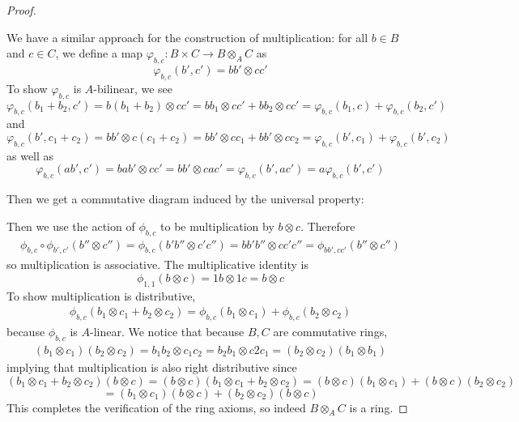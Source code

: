 \documentclass{article}
\begin{document}
\begin{proof}
\begin{enumerate}[(a)]
    We have a similar approach for the construction of multiplication: for all $b\in B$ and $c\in C$, we define a map $\varphi_{b,c}:B\times C\to B\otimes_A C$ as
    \[
    \varphi_{b,c}(b',c')=bb'\otimes cc'
    \]
    To show $\varphi_{b,c}$ is $A$-bilinear, we see
    \[
    \varphi_{b,c}(b_1+b_2,c')=b(b_1+b_2)\otimes cc'=bb_1\otimes cc'+bb_2\otimes cc'=\varphi_{b,c}(b_1,c)+\varphi_{b,c}(b_2,c')
    \]
    and
    \[
    \varphi_{b,c}(b',c_1+c_2)=bb'\otimes c(c_1+c_2)=bb'\otimes cc_1+bb'\otimes cc_2=\varphi_{b,c}(b',c_1)+\varphi_{b,c}(b',c_2)
    \]
    as well as
    \[
    \varphi_{b,c}(ab',c')=bab'\otimes cc'=bb'\otimes cac'=\varphi_{b,c}(b',ac')=a\varphi_{b,c}(b',c')
    \]
    \end{enumerate}
    Then we get a commutative diagram induced by the universal property:
    \begin{center}
    \end{center}
    Then we use the action of $\phi_{b,c}$ to be multiplication by $b\otimes c$. Therefore
    \begin{align*}
        \phi_{b,c}\circ \phi_{b',c'}(b''\otimes c'')=\phi_{b,c}(b'b''\otimes c'c'')=bb'b''\otimes cc'c''=\phi_{bb',cc'}(b''\otimes c'')
    \end{align*}
    so multiplication is associative. The multiplicative identity is
    \[
    \phi_{1,1}(b\otimes c)=1b\otimes 1c=b\otimes c
    \]
    To show multiplication is distributive,
    \begin{align*}
        \phi_{b,c}(b_1\otimes c_1+b_2\otimes c_2)=\phi_{b,c}(b_1\otimes c_1)+\phi_{b,c}(b_2\otimes c_2)
    \end{align*}
    because $\phi_{b,c}$ is $A$-linear. We notice that because $B,C$ are commutative rings,
    \begin{align*}
        (b_1\otimes c_1)(b_2\otimes c_2)=b_1b_2\otimes c_1c_2=b_2b_1\otimes c2c_1=(b_2\otimes c_2)(b_1\otimes b_1)
    \end{align*}
    implying that multiplication is also right distributive since
    \[
    (b_1\otimes c_1+b_2\otimes c_2)(b\otimes c)=(b\otimes c)(b_1\otimes c_1+b_2\otimes c_2)=(b\otimes c)(b_1\otimes c_1)+(b\otimes c)(b_2\otimes c_2)
    \]
    \[
    =(b_1\otimes c_1)(b\otimes c)+(b_2\otimes c_2)(b\otimes c)
    \]
    This completes the verification of the ring axioms, so indeed $B\otimes_A C$ is a ring.
\end{proof}
\end{document}
